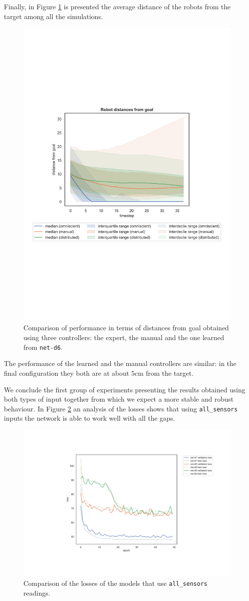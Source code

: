 Finally, in Figure \ref{fig:net-d6distance} is presented the average distance of the 
robots from the target among all the simulations. 
\begin{figure}[!htb]
	\centering
	\includegraphics[width=.65\textwidth]{contents/images/net-d6/distances-from-goal-compressed-distributed}%
		\caption[Evaluation of \texttt{net-d6} distances from goal.]{Comparison of 
		performance in terms of distances from goal obtained using three 
		controllers: the expert, the manual and the one learned from \texttt{net-d6}.}
	\label{fig:net-d6distance}
\end{figure}
The performance of the learned and the manual controllers are similar: in the 
final configuration they both are at about $5$\gls{cm} from the target. 

We conclude the first group of experiments presenting the results obtained 
using both types of input together from which we expect a more stable and 
robust behaviour. 
In Figure \ref{fig:distlossall} an analysis of the losses shows that using 
\texttt{all\_sensors} inputs the network is able to work well with all the 
gaps. 
\begin{figure}[!htb]
	\centering
	\includegraphics[width=.8\textwidth]{contents/images/task1/loss-distributed-all_sensors@}%
	\caption{Comparison of the losses of the models that use \texttt{all\_sensors} 
		readings.}
	\label{fig:distlossall}
\end{figure}

